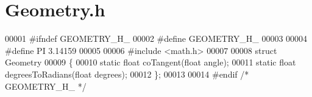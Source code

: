\section{Geometry.\+h}
\label{_geometry_8h_source}

\begin{DoxyCode}
00001 \textcolor{preprocessor}{#ifndef GEOMETRY\_H\_}
00002 \textcolor{preprocessor}{#define GEOMETRY\_H\_}
00003 
00004 \textcolor{preprocessor}{#define PI 3.14159}
00005 
00006 \textcolor{preprocessor}{#include <math.h>}
00007 
00008 \textcolor{keyword}{struct }Geometry
00009 \{
00010     \textcolor{keyword}{static} \textcolor{keywordtype}{float} coTangent(\textcolor{keywordtype}{float} angle);
00011     \textcolor{keyword}{static} \textcolor{keywordtype}{float} degreesToRadians(\textcolor{keywordtype}{float} degrees);
00012 \};
00013 
00014 \textcolor{preprocessor}{#endif }\textcolor{comment}{/* GEOMETRY\_H\_ */}\textcolor{preprocessor}{}
\end{DoxyCode}
